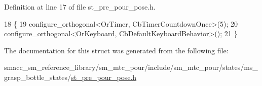 Definition at line 17 of file st\+\_\+pre\+\_\+pour\+\_\+pose.\+h.


\begin{DoxyCode}
18     \{
19         configure\_orthogonal<OrTimer,  CbTimerCountdownOnce>(5);    
20         configure\_orthogonal<OrKeyboard, CbDefaultKeyboardBehavior>();
21     \}
\end{DoxyCode}


The documentation for this struct was generated from the following file\+:\begin{DoxyCompactItemize}
\item 
smacc\+\_\+sm\+\_\+reference\+\_\+library/sm\+\_\+mtc\+\_\+pour/include/sm\+\_\+mtc\+\_\+pour/states/ms\+\_\+grasp\+\_\+bottle\+\_\+states/\hyperlink{st__pre__pour__pose_8h}{st\+\_\+pre\+\_\+pour\+\_\+pose.\+h}\end{DoxyCompactItemize}
